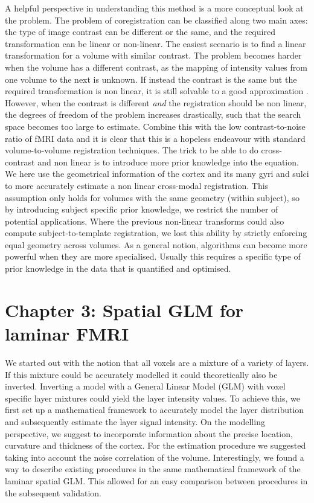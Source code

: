 A helpful perspective in understanding this method is a more conceptual look at the problem. The problem of coregistration can be classified along two main axes: the type of image contrast can be different or the same, and the required transformation can be linear or non-linear. The easiest scenario is to find a linear transformation for a volume with similar contrast. The problem becomes harder when the volume has a different contrast, as the mapping of intensity values from one volume to the next is unknown. If instead the contrast is the same but the required transformation is non linear, it is still solvable to a good approximation \cite{Collins1995}. However, when the contrast is different \emph{and} the registration should be non linear, the degrees of freedom of the problem increases drastically, such that the search space becomes too large to estimate. Combine this with the low contrast-to-noise ratio of fMRI data and it is clear that this is a hopeless endeavour with standard volume-to-volume registration techniques. The trick to be able to do cross-contrast and non linear is to introduce more prior knowledge into the equation. We here use the geometrical information of the cortex and its many gyri and sulci to more accurately estimate a non linear cross-modal registration. This assumption only holds for volumes with the same geometry (within subject), so by introducing subject specific prior knowledge, we restrict the number of potential applications. Where the previous non-linear transforms could also compute subject-to-template registration, we lost this ability by strictly enforcing equal geometry across volumes. As a general notion, algorithms can become more powerful when they are more specialised. Usually this requires a specific type of prior knowledge in the data that is quantified and optimised.

\section*{Chapter 3: Spatial GLM for laminar FMRI}
We started out with the notion that all voxels are a mixture of a variety of layers. If this mixture could be accurately modelled it could theoretically also be inverted.
Inverting a model with a General Linear Model (GLM) with voxel specific layer mixtures could yield the layer intensity values. To achieve this, we first set up a mathematical framework to accurately model the layer distribution and subsequently estimate the layer signal intensity. On the modelling perspective, we suggest to incorporate information about the precise location, curvature and thickness of the cortex. For the estimation procedure we suggested taking into account the noise correlation of the volume. Interestingly, we found a way to describe existing procedures in the same mathematical framework of the laminar spatial GLM. This allowed for an easy comparison between procedures in the subsequent validation.

